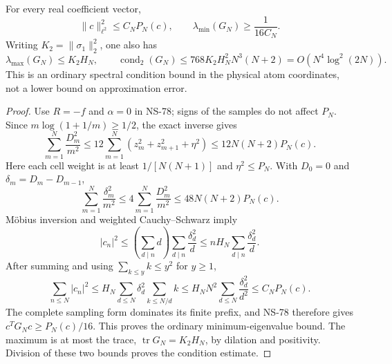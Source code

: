 \begin{proposition}
\label{prop:ns81-conditioning}
For every real coefficient vector,
\begin{equation}
 \|c\|_{\ell^2}^2\leq C_N P_N(c),\qquad
 \lambda_{\min}(G_N)\geq\frac1{16C_N}.
 \label{eq:ns81-conditioning}
\end{equation}
Writing $K_2=\|\sigma_1\|_2^2$, one also has
\[
 \lambda_{\max}(G_N)\leq K_2H_N,\qquad
 \operatorname{cond}_2(G_N)\leq768K_2H_N^2N^3(N+2)
                         =O(N^4\log^2(2N)).
\]
This is an ordinary spectral condition bound in the physical atom
coordinates, not a lower bound on approximation error.
\end{proposition}
\begin{proof}
Use $R=-f$ and $\alpha=0$ in NS-78; signs of the samples do not affect
$P_N$. Since $m\log(1+1/m)\geq1/2$, the exact inverse gives
\[
 \sum_{m=1}^N\frac{D_m^2}{m^2}
 \leq12\sum_{m=1}^N(z_m^2+z_{m+1}^2+\eta^2)
 \leq12N(N+2)P_N(c).
\]
Here each cell weight is at least $1/[N(N+1)]$ and $\eta^2\leq P_N$.
With $D_0=0$ and $\delta_m=D_m-D_{m-1}$,
\[
 \sum_{m=1}^N\frac{\delta_m^2}{m^2}
 \leq4\sum_{m=1}^N\frac{D_m^2}{m^2}
 \leq48N(N+2)P_N(c).
\]
M\"obius inversion and weighted Cauchy--Schwarz imply
\[
 |c_n|^2\leq\left(\sum_{d\mid n}d\right)
                  \sum_{d\mid n}\frac{\delta_d^2}{d}
 \leq nH_N\sum_{d\mid n}\frac{\delta_d^2}{d}.
\]
After summing and using $\sum_{k\leq y}k\leq y^2$ for $y\geq1$,
\[
 \sum_{n\leq N}|c_n|^2
 \leq H_N\sum_{d\leq N}\delta_d^2\sum_{k\leq N/d}k
 \leq H_NN^2\sum_{d\leq N}\frac{\delta_d^2}{d^2}
 \leq C_NP_N(c).
\]
The complete sampling form dominates its finite prefix, and NS-78
therefore gives $c^TG_Nc\geq P_N(c)/16$. This proves the ordinary
minimum-eigenvalue bound. The maximum is at most the trace,
$\operatorname{tr}G_N=K_2H_N$, by dilation and positivity. Division
of these two bounds proves the condition estimate.
\end{proof}

